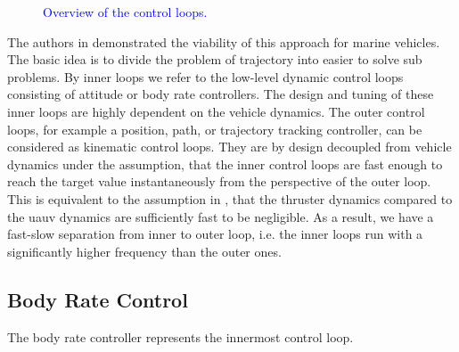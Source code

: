 \begin{figure}
	\caption{\textcolor{blue}{Overview of the control loops.}}
	\label{fig:inner-outer-loop-feedback-control}
\end{figure}
The authors in \cite{Maurya09} demonstrated the viability of this approach for marine vehicles. The basic idea is to divide the problem of trajectory into easier to solve sub problems. By inner loops we refer to the low-level dynamic control loops consisting of attitude or body rate controllers. The design and tuning of these inner loops are highly dependent on the vehicle dynamics. The outer control loops, for example a position, path, or trajectory tracking controller, can be considered as kinematic control loops. They are by design decoupled from vehicle dynamics under the assumption, that the inner control loops are fast enough to reach the target value instantaneously from the perspective of the outer loop. This is equivalent to the assumption in , that the thruster dynamics compared to the \ac{uauv} dynamics are sufficiently fast to be negligible. As a result, we have a fast-slow separation from inner to outer loop, i.e. the inner loops run with a significantly higher frequency than the outer ones.







\subsection{Body Rate Control}
The body rate controller represents the innermost control loop.

